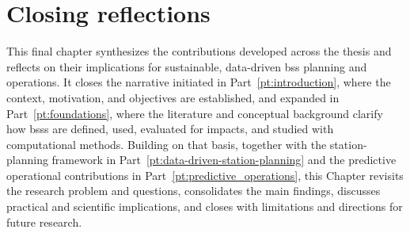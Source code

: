 \chapter{Closing reflections}
\label{ch:conclusions}

This final chapter synthesizes the contributions developed across the thesis and reflects on their implications for sustainable, data-driven \ac{bss} planning and operations. It closes the narrative initiated in Part~\ref{pt:introduction}, where the context, motivation, and objectives are established, and expanded in Part~\ref{pt:foundations}, where the literature and conceptual background clarify how \acp{bss} are defined, used, evaluated for impacts, and studied with computational methods. Building on that basis, together with the station-planning framework in Part~\ref{pt:data-driven-station-planning} and the predictive operational contributions in Part~\ref{pt:predictive_operations}, this Chapter revisits the research problem and questions, consolidates the main findings, discusses practical and scientific implications, and closes with limitations and directions for future research.














